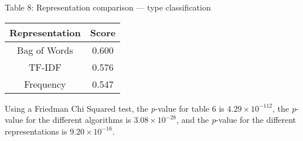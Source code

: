 \documentclass{article}
\begin{document}
\begin{center}
Table 8: Representation comparison --- type classification\\
\begin{tabular}{ |c|c| }
\hline {\bf Representation}& {\bf Score}\\
\hline Bag of Words & 0.600\\
\hline TF-IDF & 0.576\\
\hline Frequency & 0.547\\
\hline
\end{tabular}
\end{center}

Using a Friedman Chi Squared test, the \emph{p}-value for table 6 is $4.29 \times 10^{-112}$, the \emph{p}-value for the different algorithms is $3.08 \times 10^{-28}$, and the \emph{p}-value for the different representations is $9.20 \times 10^{-16}$.
\end{document}
